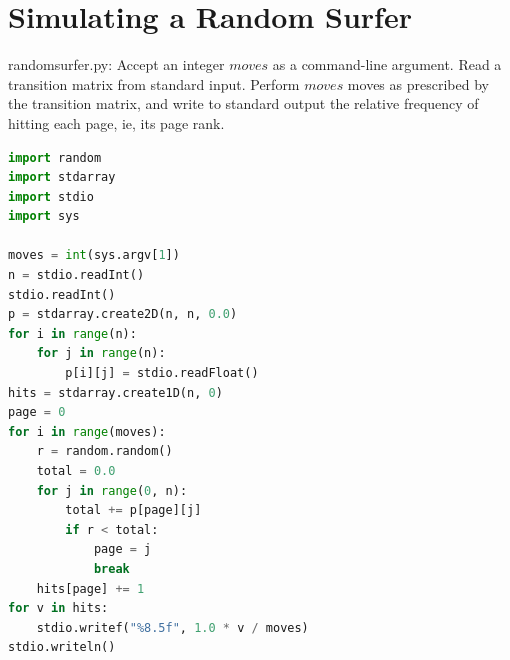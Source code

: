 \documentclass[8pt,a4paper,compress]{beamer}
\begin{document}
\section{Simulating a Random Surfer}
\begin{frame}[fragile]
\pause

\begin{framed}
\tiny randomsurfer.py: Accept an integer $moves$ as a command-line argument. Read a transition matrix from standard input. Perform $moves$ moves as prescribed by the transition matrix, and write to standard output the relative frequency of hitting each page, ie, its page rank.
\end{framed}

\begin{minipage}{170pt}
\begin{lstlisting}[language=Python,style=focusin]
import random
import stdarray
import stdio
import sys

moves = int(sys.argv[1])
n = stdio.readInt()
stdio.readInt()
p = stdarray.create2D(n, n, 0.0)
for i in range(n):
    for j in range(n):
        p[i][j] = stdio.readFloat()
hits = stdarray.create1D(n, 0)
page = 0
for i in range(moves):
    r = random.random()
    total = 0.0
    for j in range(0, n):
        total += p[page][j]
        if r < total:
            page = j
            break
    hits[page] += 1
for v in hits:
    stdio.writef("%8.5f", 1.0 * v / moves)
stdio.writeln()
\end{lstlisting}
\end{minipage}
\begin{minipage}{130pt}
\end{minipage}
\end{frame}
\end{document}
